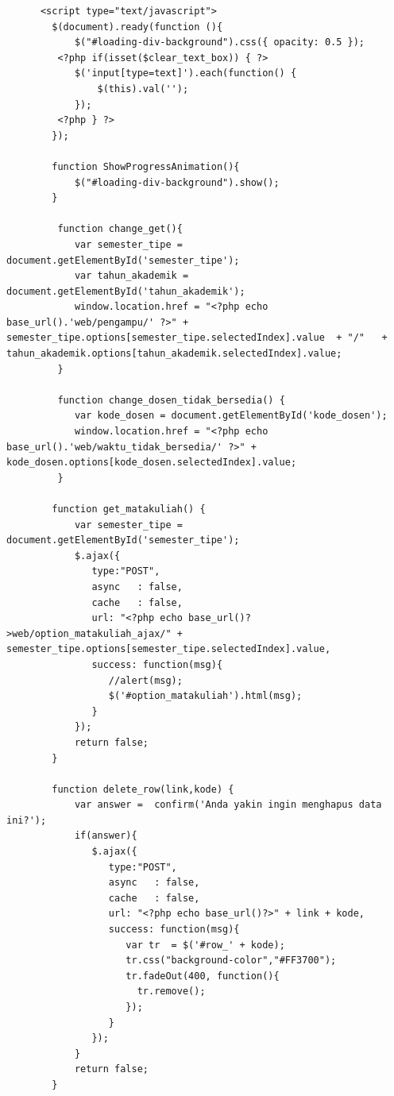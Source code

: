 \begin{enumerate}
\begin{lstlisting}
      <script type="text/javascript">
        $(document).ready(function (){
            $("#loading-div-background").css({ opacity: 0.5 });
         <?php if(isset($clear_text_box)) { ?>    
            $('input[type=text]').each(function() {
                $(this).val('');
            });
         <?php } ?>
        });
    
        function ShowProgressAnimation(){
            $("#loading-div-background").show();
        }
         
         function change_get(){     
            var semester_tipe = document.getElementById('semester_tipe');
            var tahun_akademik = document.getElementById('tahun_akademik');
            window.location.href = "<?php echo base_url().'web/pengampu/' ?>" + semester_tipe.options[semester_tipe.selectedIndex].value  + "/"   + tahun_akademik.options[tahun_akademik.selectedIndex].value;     
         }
         
         function change_dosen_tidak_bersedia() {
            var kode_dosen = document.getElementById('kode_dosen');         
            window.location.href = "<?php echo base_url().'web/waktu_tidak_bersedia/' ?>" + kode_dosen.options[kode_dosen.selectedIndex].value;     
         }
         
        function get_matakuliah() {        
            var semester_tipe = document.getElementById('semester_tipe');
            $.ajax({
               type:"POST",
               async   : false,
               cache   : false,
               url: "<?php echo base_url()?>web/option_matakuliah_ajax/" + semester_tipe.options[semester_tipe.selectedIndex].value,
               success: function(msg){
                  //alert(msg);
                  $('#option_matakuliah').html(msg);
               }
            });
            return false;        
        }

        function delete_row(link,kode) {
            var answer =  confirm('Anda yakin ingin menghapus data ini?');
            if(answer){
               $.ajax({
                  type:"POST",
                  async   : false,
                  cache   : false,
                  url: "<?php echo base_url()?>" + link + kode,
                  success: function(msg){
                     var tr  = $('#row_' + kode);
                     tr.css("background-color","#FF3700");
                     tr.fadeOut(400, function(){
                       tr.remove();
                     });                  
                  }
               });
            }
            return false;
        }
        

\end{lstlisting}
\end{enumerate}
